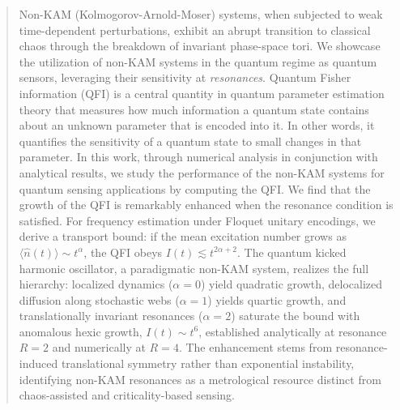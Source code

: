 \documentclass[amsmath,nobibnotes,aps,amssymb,pra, prl,aps,showpacs,superscriptaddress,twocolumn, longbibliography, reprint]{revtex4-2}
\def\endproof{\hfill$\blacksquare$}
\begin{document}
\begin{abstract}
Non-KAM (Kolmogorov-Arnold-Moser) systems, when subjected to weak time-dependent perturbations, exhibit an abrupt transition to classical chaos through the breakdown of invariant phase-space tori. We showcase the utilization of non-KAM systems in the quantum regime as quantum sensors, leveraging their sensitivity at \textit{resonances}.
Quantum Fisher information (QFI) is a central quantity in quantum parameter estimation theory that measures how much information a quantum state contains about an unknown parameter that is encoded into it. In other words, it quantifies the sensitivity of a quantum state to small changes in that parameter. In this work, through numerical analysis in conjunction with analytical results, we study the performance of the non-KAM systems for quantum sensing applications by computing the QFI. %
We find that the growth of the QFI is remarkably enhanced when the resonance condition is satisfied. For frequency estimation
under Floquet unitary encodings, we derive a transport bound: if the mean
excitation number grows as $\langle\hat n(t)\rangle\sim t^{\alpha}$, the QFI
obeys $I(t)\lesssim t^{2\alpha+2}$.  The quantum kicked harmonic
oscillator, a paradigmatic non-KAM system, realizes the full hierarchy:
localized dynamics ($\alpha=0$) yield quadratic growth, delocalized
diffusion along stochastic webs ($\alpha=1$) yields quartic growth, and
translationally invariant resonances ($\alpha=2$) saturate the bound with
anomalous hexic growth, $I(t)\sim t^{6}$, established analytically at
resonance $R=2$ and numerically at $R=4$. The enhancement stems from
resonance-induced translational symmetry rather than exponential
instability, identifying non-KAM resonances as a metrological resource
distinct from chaos-assisted and criticality-based sensing.
\end{abstract}


\maketitle


\def\endproof{\hfill$\blacksquare$}
\end{document}
